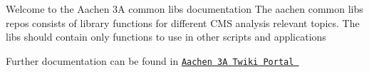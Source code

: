 Welcome to the Aachen 3\-A common libs documentation The aachen common libs repos consists of library functions for different C\-M\-S analysis relevant topics. The libs should contain only functions to use in other scripts and applications

Further documentation can be found in \href{https://twiki.cern.ch/twiki/bin/viewauth/CMS/Aachen3APortal}{\tt Aachen 3\-A Twiki Portal } 